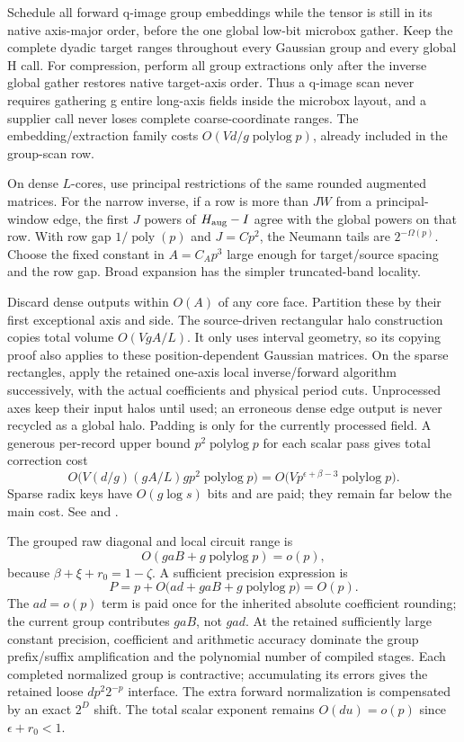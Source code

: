 \documentclass[11pt]{article}
\newcommand{\poly}{\operatorname{poly}}
\newcommand{\plog}{\operatorname{polylog}}
\newcommand{\file}[1]{\href{#1}{\texttt{\detokenize{#1}}}}
\begin{document}
Schedule all forward q-image group embeddings while the tensor is still in its native axis-major order, before the one global low-bit microbox gather. Keep the complete dyadic target ranges throughout every Gaussian group and every global H call. For compression, perform all group extractions only after the inverse global gather restores native target-axis order. Thus a q-image scan never requires gathering g entire long-axis fields inside the microbox layout, and a supplier call never loses complete coarse-coordinate ranges. The embedding/extraction family costs $O(Vd/g\plog p)$, already included in the group-scan row.

On dense $L$-cores, use principal restrictions of the same rounded augmented matrices. For the narrow inverse, if a row is more than $JW$ from a principal-window edge, the first $J$ powers of $H_{\rm aug}-I$ agree with the global powers on that row. With row gap $1/\poly(p)$ and $J=Cp^2$, the Neumann tails are $2^{-\Omega(p)}$. Choose the fixed constant in $A=C_Ap^3$ large enough for target/source spacing and the row gap. Broad expansion has the simpler truncated-band locality.

Discard dense outputs within $O(A)$ of any core face. Partition these by their first exceptional axis and side. The source-driven rectangular halo construction copies total volume $O(VgA/L)$. It only uses interval geometry, so its copying proof also applies to these position-dependent Gaussian matrices. On the sparse rectangles, apply the retained one-axis local inverse/forward algorithm successively, with the actual coefficients and physical period cuts. Unprocessed axes keep their input halos until used; an erroneous dense edge output is never recycled as a global halo. Padding is only for the currently processed field. A generous per-record upper bound $p^2\plog p$ for each scalar pass gives total correction cost
\[
 O\bigl(V(d/g)(gA/L)g p^2\plog p\bigr)
 =O\bigl(Vp^{\epsilon+\beta-3}\plog p\bigr).
\]
Sparse radix keys have $O(g\log s)$ bits and are paid; they remain far below the main cost. See \file{HALO-THEOREM.md} and \file{PHASE-LAYOUT-AUDIT.md}.

The grouped raw diagonal and local circuit range is
\[
 O(gaB+g\plog p)=o(p),
\]
because $\beta+\xi+r_0=1-\zeta$. A sufficient precision expression is
\[
 P=p+O\bigl(ad+gaB+g\plog p\bigr)=O(p).
\]
The $ad=o(p)$ term is paid once for the inherited absolute coefficient rounding; the current group contributes $gaB$, not $gad$. At the retained sufficiently large constant precision, coefficient and arithmetic accuracy dominate the group prefix/suffix amplification and the polynomial number of compiled stages. Each completed normalized group is contractive; accumulating its errors gives the retained loose $dp^2 2^{-p}$ interface. The extra forward normalization is compensated by an exact $2^D$ shift. The total scalar exponent remains $O(du)=o(p)$ since $\epsilon+r_0<1$.
\end{document}

